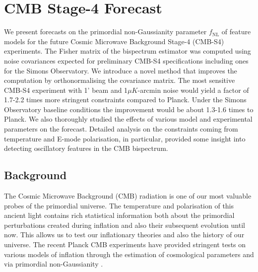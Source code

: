 \chapter{CMB Stage-4 Forecast}
\label{chapter:CMB_state-4_forecast}

\ifpdf
    \graphicspath{{Chapter4/Figs/Raster/}{Chapter4/Figs/PDF/}{Chapter4/Figs/}}
\else
    \graphicspath{{Chapter4/Figs/Vector/}{Chapter4/Figs/}}
\fi

	
We present forecasts on the primordial non-Gaussianity parameter $f_\text{NL}$ of feature models for the future Cosmic Microwave Background Stage-4 (CMB-S4) experiments. The Fisher matrix of the bispectrum estimator was computed using noise covariances expected for preliminary CMB-S4 specifications including ones for the Simons Observatory. We introduce a novel method that improves the computation by orthonormalising the covariance matrix. The most sensitive CMB-S4 experiment with 1' beam and 1$\mu K$-arcmin noise would yield a factor of 1.7-2.2 times more stringent constraints compared to Planck. Under the Simons Observatory baseline conditions the improvement would be about 1.3-1.6 times to Planck. We also thoroughly studied the effects of various model and experimental parameters on the forecast. Detailed analysis on the constraints coming from temperature and E-mode polarisation, in particular, provided some insight into detecting oscillatory features in the CMB bispectrum.


\section{Background}

The Cosmic Microwave Background (CMB) radiation is one of our most valuable probes of the primordial universe. The temperature and polarisation of this ancient light contains rich statistical information both about the primordial perturbations created during inflation and also their subsequent evolution until now.  This allows us to test our inflationary theories and also the history of our universe. The recent Planck CMB experiments have provided stringent tests on various models of inflation through the estimation of cosmological parameters and via primordial non-Gaussianity \cite{PlanckCollaboration2015,PlanckCollaboration2018}.

